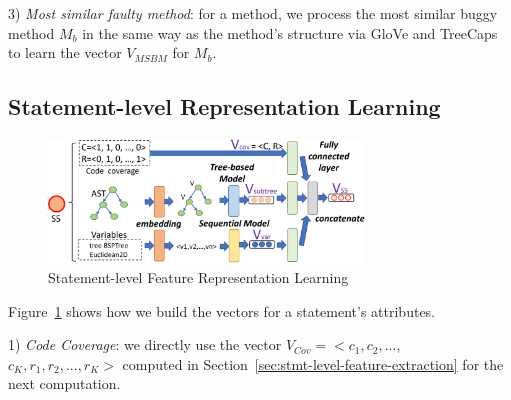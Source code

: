 
3) {\em Most similar faulty method}: for a method, we
process the most similar buggy method $M_b$ 
in the same way as the method's structure via GloVe and TreeCaps to
learn the vector $V_{MSBM}$ for $M_b$.


\subsection{Statement-level Representation Learning}

\begin{figure}[t]
	\centering
	\includegraphics[width=3.3in]{graphs/step-2-statement-new-2.png}
        \vspace{-9pt}
	\caption{Statement-level Feature Representation Learning}
	\label{statement-level-feature-learning}
\end{figure}

Figure~\ref{statement-level-feature-learning} shows how we build the
vectors for a statement's attributes.

1) {\em Code Coverage}: we directly use the vector
$V_{Cov} = <c_1, c_2, ...$, $c_K, r_1, r_2, ..., r_K>$ computed in
Section~\ref{sec:stmt-level-feature-extraction} for the next
computation.

